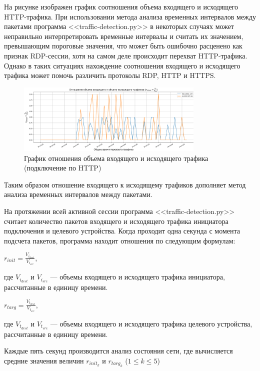 \documentclass[bachelor, och, coursework]{SCWorks}
\begin{document}
На рисунке изображен график соотношения объема входящего и исходящего HTTP-трафика. 
При использовании метода анализа временных интервалов между пакетами программа <<traffic-detection.py>> 
в некоторых случаях может неправильно интерпретировать временные интервалы и считать их значением, превышающим пороговые значения, 
что может быть ошибочно расценено как признак RDP-сессии, хотя на самом деле происходит перехват HTTP-трафика. Однако в таких 
ситуациях нахождение соотношения входящего и исходящего трафика может помочь различить протоколы RDP, HTTP и HTTPS.

\begin{figure}[H]
  \centering
  \includegraphics[width=0.8\textwidth]{photo/inout-http.png}
  \caption{График отношения объема входящего и исходящего трафика (подключение по HTTP)}
  \label{http-inout}
\end{figure}

Таким образом отношение входящего к исходящему трафиков дополняет метод анализа временных интервалов между пакетами.

На протяжении всей активной сессии программа <<traffic-detection.py>> считает количество пакетов входящего и исходящего трафика
инициатора подключения и целевого устройства. Когда проходит одна секунда с момента подсчета пакетов, программа находит отношения
по следующим формулам:

\begin{center}
  $r_{init} = \frac{V_{i_{dest}}}{V_{i_{src}}}$,
\end{center}

где $V_{i_{dest}}$ и $V_{i_{src}}$ --- объемы входящего и исходящего трафика инициатора, рассчитанные в единицу времени. 

\begin{center}
  $r_{targ} = \frac{V_{t_{dest}}}{V_{t_{src}}}$,
\end{center}

где $V_{t_{dest}}$ и $V_{t_{src}}$ --- объемы входящего и исходящего трафика целевого устройства, рассчитанные в единицу времени. 

Каждые пять секунд производится анализ состояния сети, где вычисляется средние значения величин $r_{init_{k}}$ и $r_{targ_{k}}$ ($1 \leq k \leq 5$)
\end{document}
